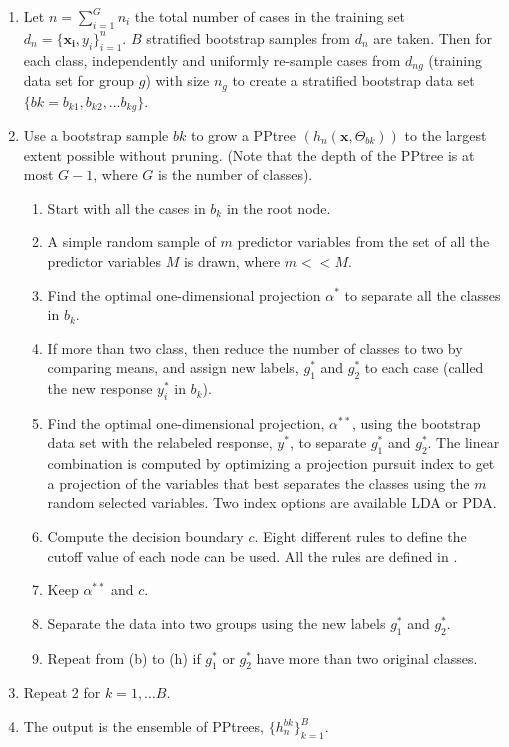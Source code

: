 \documentclass[12pt]{article}\usepackage[]{graphicx}\usepackage[]{color}
\begin{document}
\begin{enumerate}

\item Let $n=\sum_{i=1}^G n_i$ the total number of cases in the training set $d_n=\{\mathbf{x_i}, y_i\}_{i=1}^n$. $B$ stratified bootstrap samples from $d_n$ are taken. Then for each class, independently and uniformly re-sample cases from $d_{ng}$ (training data set for group $g$) with size $n_g$ to create a stratified bootstrap data set  $\{bk= b_{k1}, b_{k2}, \ldots b_{kg}\}$.

\item Use a bootstrap sample $bk$ to grow a PPtree $(h_n(\mathbf{x}, \Theta_{bk}))$ to the largest extent possible without pruning. (Note that the depth of the PPtree is at most $G-1$, where $G$ is the number of classes).

\begin{enumerate}
\item Start with all the cases in $b_k$ in the root node.
\item A simple random sample of $m$ predictor variables from the set of all the predictor variables $M$ is drawn, where $m<<M$.
\item Find the optimal one-dimensional projection $\alpha^*$ to separate all the classes in $b_k$.
\item If more than two class, then reduce the number of classes to two by comparing means, and assign new labels, $g_1^*$ and $g_2^*$ to each case (called the new response $y_i^*$ in $b_k$).

\item Find the optimal one-dimensional projection, $\alpha^{**}$, using the bootstrap data set with the relabeled response, $y^*$, to separate $g_1^*$ and $g_2^*$.
The linear combination is computed by optimizing a projection pursuit index to get a projection of the variables that best separates the classes using the $m$ random selected variables. Two index options are available LDA or PDA.
\item Compute the decision boundary $c$.
Eight different rules to define the cutoff value of each node can be used. All the rules are defined in \cite{PPtreeViz}.
\item Keep $\alpha^{**}$ and $c$.
\item Separate the data into two groups using the new labels $g_1^*$ and $g_2^*$.
\item Repeat from (b) to (h) if $g_1^*$ or $g_2^*$ have more than two original classes.
\end{enumerate}
\item Repeat 2 for $k = 1,\ldots B$.
\item The output is the ensemble of PPtrees, $\{h_n^{bk}\}_{k=1}^B$.
\end{enumerate}
\end{document}
